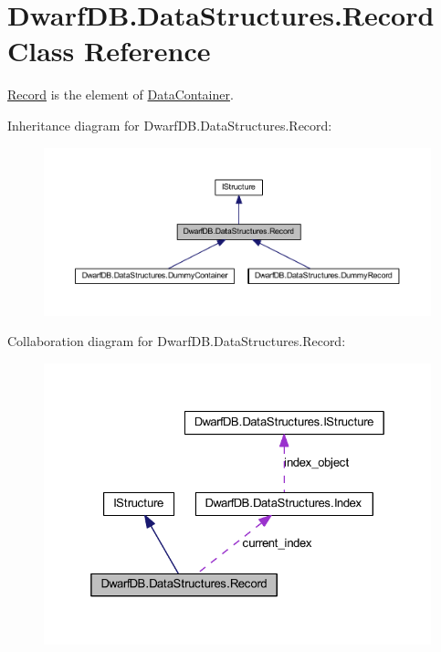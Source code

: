 \hypertarget{class_dwarf_d_b_1_1_data_structures_1_1_record}{
\section{DwarfDB.DataStructures.Record Class Reference}
\label{class_dwarf_d_b_1_1_data_structures_1_1_record}
}


\hyperlink{class_dwarf_d_b_1_1_data_structures_1_1_record}{Record} is the element of \hyperlink{class_dwarf_d_b_1_1_data_structures_1_1_data_container}{DataContainer}.  




Inheritance diagram for DwarfDB.DataStructures.Record:
\nopagebreak
\begin{figure}[H]
\begin{center}
\leavevmode
\includegraphics[width=400pt]{class_dwarf_d_b_1_1_data_structures_1_1_record__inherit__graph}
\end{center}
\end{figure}


Collaboration diagram for DwarfDB.DataStructures.Record:
\nopagebreak
\begin{figure}[H]
\begin{center}
\leavevmode
\includegraphics[width=325pt]{class_dwarf_d_b_1_1_data_structures_1_1_record__coll__graph}
\end{center}
\end{figure}
